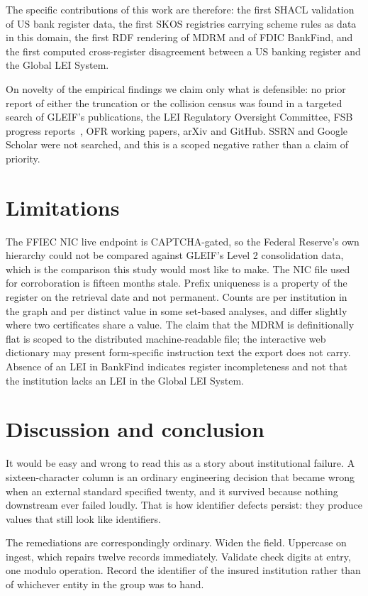 \documentclass[11pt]{article}
\begin{document}
The specific contributions of this work are therefore: the first SHACL validation of US bank register data, the first SKOS registries carrying scheme rules as data in this domain, the first RDF rendering of MDRM and of FDIC BankFind, and the first computed cross-register disagreement between a US banking register and the Global LEI System.

On novelty of the empirical findings we claim only what is defensible: no prior report of either the truncation or the collision census was found in a targeted search of GLEIF's publications, the LEI Regulatory Oversight Committee, FSB progress reports~\cite{fsb2024}, OFR working papers, arXiv and GitHub. SSRN and Google Scholar were not searched, and this is a scoped negative rather than a claim of priority.

\section{Limitations}

The FFIEC NIC live endpoint is CAPTCHA-gated, so the Federal Reserve's own hierarchy could not be compared against GLEIF's Level 2 consolidation data, which is the comparison this study would most like to make. The NIC file used for corroboration is fifteen months stale. Prefix uniqueness is a property of the register on the retrieval date and not permanent. Counts are per institution in the graph and per distinct value in some set-based analyses, and differ slightly where two certificates share a value. The claim that the MDRM is definitionally flat is scoped to the distributed machine-readable file; the interactive web dictionary may present form-specific instruction text the export does not carry. Absence of an LEI in BankFind indicates register incompleteness and not that the institution lacks an LEI in the Global LEI System.

\section{Discussion and conclusion}

It would be easy and wrong to read this as a story about institutional failure. A sixteen-character column is an ordinary engineering decision that became wrong when an external standard specified twenty, and it survived because nothing downstream ever failed loudly. That is how identifier defects persist: they produce values that still look like identifiers.

The remediations are correspondingly ordinary. Widen the field. Uppercase on ingest, which repairs twelve records immediately. Validate check digits at entry, one modulo operation. Record the identifier of the insured institution rather than of whichever entity in the group was to hand.
\end{document}
